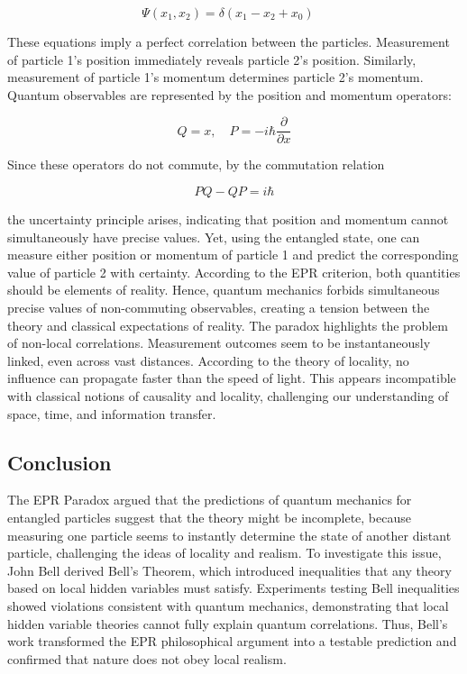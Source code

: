 \documentclass[17pt,a4paper]{extarticle}
\begin{document}
\begin{equation}
\Psi(x_1, x_2) = \delta(x_1 - x_2 + x_0) \quad
\end{equation}

These equations imply a perfect correlation between the particles. Measurement of particle 1’s position immediately reveals particle 2’s position. Similarly, measurement of particle 1’s momentum determines particle 2’s momentum. Quantum observables are represented by the position and momentum operators:

\[
Q = x, \quad P = -i\hbar \frac{\partial}{\partial x}
\]

Since these operators do not commute, by the commutation relation

\[
PQ - QP = i\hbar
\]

the uncertainty principle arises, indicating that position and momentum cannot simultaneously have precise values. Yet, using the entangled state, one can measure either position or momentum of particle 1 and predict the corresponding value of particle 2 with certainty. According to the EPR criterion, both quantities should be elements of reality. Hence, quantum mechanics forbids simultaneous precise values of non-commuting observables, creating a tension between the theory and classical expectations of reality. The paradox highlights the problem of non-local correlations. Measurement outcomes seem to be instantaneously linked, even across vast distances. According to the theory of locality, no influence can propagate faster than the speed of light. This appears incompatible with classical notions of causality and locality, challenging our understanding of space, time, and information transfer.

\subsection{Conclusion}

The EPR Paradox argued that the predictions of quantum mechanics for entangled particles suggest that the theory might be incomplete, because measuring one particle seems to instantly determine the state of another distant particle, challenging the ideas of locality and realism. To investigate this issue, John Bell derived Bell's Theorem, which introduced inequalities that any theory based on local hidden variables must satisfy. Experiments testing Bell inequalities showed violations consistent with quantum mechanics, demonstrating that local hidden variable theories cannot fully explain quantum correlations. Thus, Bell’s work transformed the EPR philosophical argument into a testable prediction and confirmed that nature does not obey local realism.
\end{document}
